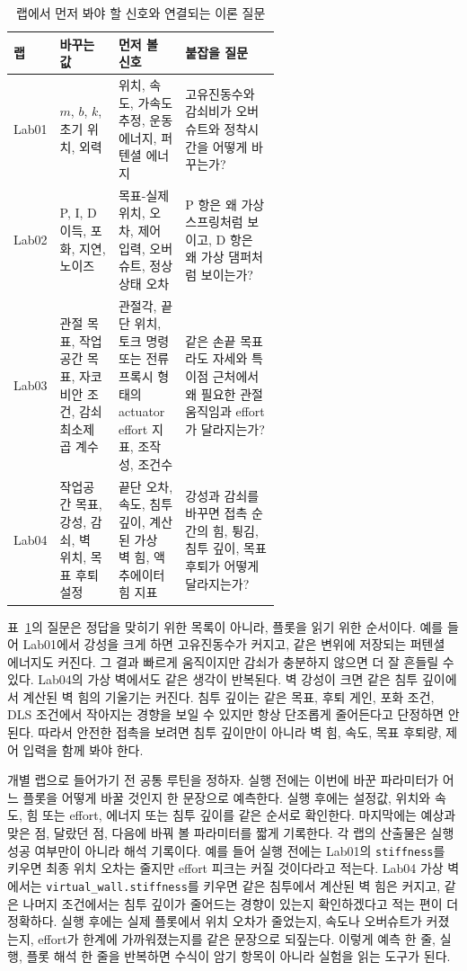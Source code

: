 \begin{table}[!htbp]
  \centering
  \caption{랩에서 먼저 봐야 할 신호와 연결되는 이론 질문}
  \label{tab:lab-observation-guide}
  \small
  \renewcommand{\arraystretch}{1.12}
  \begin{tabularx}{\linewidth}{@{}p{0.12\linewidth}p{0.22\linewidth}p{0.25\linewidth}X@{}}
    \toprule
    랩 & 바꾸는 값 & 먼저 볼 신호 & 붙잡을 질문 \\
    \midrule
    Lab01 & $m$, $b$, $k$, 초기 위치, 외력 & 위치, 속도, 가속도 추정, 운동에너지, 퍼텐셜 에너지 & 고유진동수와 감쇠비가 오버슈트와 정착시간을 어떻게 바꾸는가? \\
    Lab02 & P, I, D 이득, 포화, 지연, 노이즈 & 목표-실제 위치, 오차, 제어 입력, 오버슈트, 정상상태 오차 & P 항은 왜 가상 스프링처럼 보이고, D 항은 왜 가상 댐퍼처럼 보이는가? \\
    Lab03 & 관절 목표, 작업공간 목표, 자코비안 조건, 감쇠 최소제곱 계수 & 관절각, 끝단 위치, 토크 명령 또는 전류 프록시 형태의 actuator effort 지표, 조작성, 조건수 & 같은 손끝 목표라도 자세와 특이점 근처에서 왜 필요한 관절 움직임과 effort가 달라지는가? \\
    Lab04 & 작업공간 목표, 강성, 감쇠, 벽 위치, 목표 후퇴 설정 & 끝단 오차, 속도, 침투 깊이, 계산된 가상 벽 힘, 액추에이터 힘 지표 & 강성과 감쇠를 바꾸면 접촉 순간의 힘, 튕김, 침투 깊이, 목표 후퇴가 어떻게 달라지는가? \\
    \bottomrule
  \end{tabularx}
\end{table}

표~\ref{tab:lab-observation-guide}의 질문은 정답을 맞히기 위한 목록이 아니라, 플롯을 읽기 위한 순서이다.
예를 들어 Lab01에서 강성을 크게 하면 고유진동수가 커지고, 같은 변위에 저장되는 퍼텐셜 에너지도 커진다.
그 결과 빠르게 움직이지만 감쇠가 충분하지 않으면 더 잘 흔들릴 수 있다.
Lab04의 가상 벽에서도 같은 생각이 반복된다.
벽 강성이 크면 같은 침투 깊이에서 계산된 벽 힘의 기울기는 커진다.
침투 깊이는 같은 목표, 후퇴 게인, 포화 조건, DLS 조건에서 작아지는 경향을 보일 수 있지만 항상 단조롭게 줄어든다고 단정하면 안 된다.
따라서 안전한 접촉을 보려면 침투 깊이만이 아니라 벽 힘, 속도, 목표 후퇴량, 제어 입력을 함께 봐야 한다.

개별 랩으로 들어가기 전 공통 루틴을 정하자.
실행 전에는 이번에 바꾼 파라미터가 어느 플롯을 어떻게 바꿀 것인지 한 문장으로 예측한다.
실행 후에는 설정값, 위치와 속도, 힘 또는 effort, 에너지 또는 침투 깊이를 같은 순서로 확인한다.
마지막에는 예상과 맞은 점, 달랐던 점, 다음에 바꿔 볼 파라미터를 짧게 기록한다.
각 랩의 산출물은 실행 성공 여부만이 아니라 해석 기록이다.
예를 들어 실행 전에는 Lab01의 \texttt{stiffness}를 키우면 최종 위치 오차는 줄지만 effort 피크는 커질 것이다라고 적는다.
Lab04 가상 벽에서는 \texttt{virtual\_wall.stiffness}를 키우면 같은 침투에서 계산된 벽 힘은 커지고, 같은 나머지 조건에서는 침투 깊이가 줄어드는 경향이 있는지 확인하겠다고 적는 편이 더 정확하다.
실행 후에는 실제 플롯에서 위치 오차가 줄었는지, 속도나 오버슈트가 커졌는지, effort가 한계에 가까워졌는지를 같은 문장으로 되짚는다.
이렇게 예측 한 줄, 실행, 플롯 해석 한 줄을 반복하면 수식이 암기 항목이 아니라 실험을 읽는 도구가 된다.

